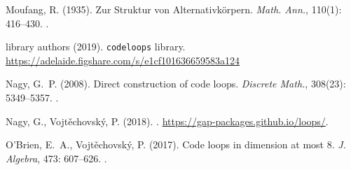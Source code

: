\documentclass{article}
\theoremstyle{plain}
\theoremstyle{definition}
\begin{document}
\begin{thebibliography}{10}
Moufang, R. (1935).
\newblock Zur {S}truktur von {A}lternativk\"{o}rpern.
\newblock \emph{Math. Ann.}, 110(1): 416--430.
\newblock {}.

{library authors} (2019).
\newblock \texttt{codeloops} library.
\newblock \url{https://adelaide.figshare.com/s/e1cf101636659583a124} %

Nagy, G.~P. (2008).
\newblock Direct construction of code loops.
\newblock \emph{Discrete Math.}, 308(23): 5349--5357.
\newblock {}.

Nagy, G., Vojt\v{e}chovsk\'{y}, P. (2018).
.
\newblock \url{https://gap-packages.github.io/loops/}.

O'Brien, E.~A., Vojt\v{e}chovsk\'{y}, P. (2017).
\newblock Code loops in dimension at most 8.
\newblock \emph{J. Algebra}, 473: 607--626.
\newblock {}.



\end{thebibliography}
\end{document}
